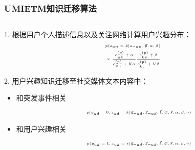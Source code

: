 \begin{frame}
\frametitle{UMIETM知识迁移算法}

\begin{columns}
\begin{column}[T]{0.42\paperwidth}
1. 根据用户个人描述信息以及关注网络计算用户兴趣分布：
\setlength{\abovedisplayskip}{1pt}
\setlength{\belowdisplayskip}{1pt}
\begin{equation}
\tiny
\label{timeUserTagLDAIVsamplingForS}
\begin{aligned}
&p(s_{un}=k|s_{\neg{un}},\vec{p},\alpha,\beta)\\
&\propto \frac{c^{(p)}_{uk}+\alpha}{c^{(p)}_{u,.}+K\alpha}
\frac{c^{(p)}_{kv}+\beta}{c^{(p)}_{k,.}+V\beta}\\
\end{aligned}
\end{equation}

2. 用户兴趣知识迁移至社交媒体文本内容中：
\begin{itemize}
	\item 和突发事件相关 
\begin{align*}
\tiny
\begin{aligned}
&p(y_{ud}=0,z_{ud}=k|\vec{y}_{\neg{ud}},\vec{z}_{\neg{ud}},\vec{t},\vec{w},\vec{s},\alpha,\beta,\gamma)\\
\end{aligned}
\end{align*}
	\item 和用户兴趣相关
\begin{align*}
\tiny
\begin{aligned}
&p(y_{ud}=1,z_{ud}=e|\vec{y}_{\neg{ud}},\vec{z}_{\neg{ud}},\vec{t},\vec{w},\vec{s},\alpha,\beta,\gamma)\\
\end{aligned}
\end{align*}

\end{itemize}

\end{column}


\end{columns}
\end{frame}
